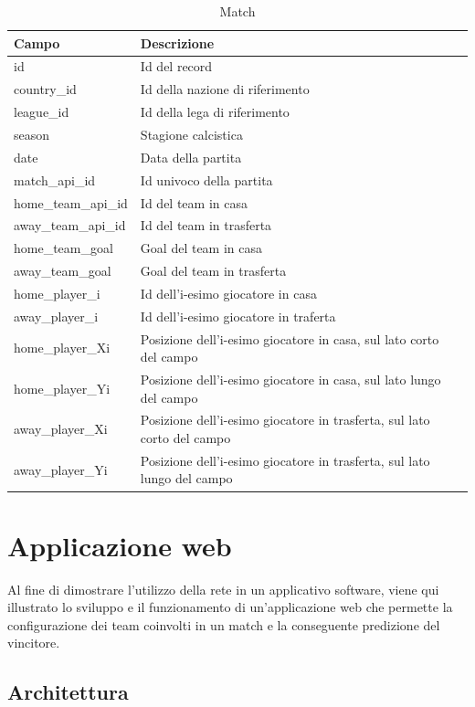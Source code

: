 \documentclass[hidelinks, 12pt]{article}
\begin{document}
	\begin{table}[H]
		\caption{Match}\label{tab:match}
		\begin{tabular}{|l|l|l|}
			\hline
			Campo & Descrizione \\
			\hline
			id & Id del record \\
			country\_id & Id della nazione di riferimento \\
			league\_id & Id della lega di riferimento \\
			season & Stagione calcistica \\
			date & Data della partita \\
			match\_api\_id & Id univoco della partita \\
			home\_team\_api\_id & Id del team in casa \\
			away\_team\_api\_id & Id del team in trasferta \\
			home\_team\_goal & Goal del team in casa \\
			away\_team\_goal & Goal del team in trasferta \\
			home\_player\_i & Id dell'i-esimo giocatore in casa \\
			away\_player\_i & Id dell'i-esimo giocatore in traferta \\
			home\_player\_Xi & Posizione dell'i-esimo giocatore in casa, sul lato corto del campo \\
			home\_player\_Yi & Posizione dell'i-esimo giocatore in casa, sul lato lungo del campo \\
			away\_player\_Xi & Posizione dell'i-esimo giocatore in trasferta, sul lato corto del campo \\
			away\_player\_Yi & Posizione dell'i-esimo giocatore in trasferta, sul lato lungo del campo \\
			\hline
		\end{tabular}
	\end{table}
	
	
	\clearpage
	\section{Applicazione web}
	
	Al fine di dimostrare l'utilizzo della rete in un applicativo software, viene qui illustrato lo sviluppo e il funzionamento di un'applicazione web che permette la configurazione dei team coinvolti in un match e la conseguente predizione del vincitore.
	
	\subsection{Architettura}
	
\end{document}
